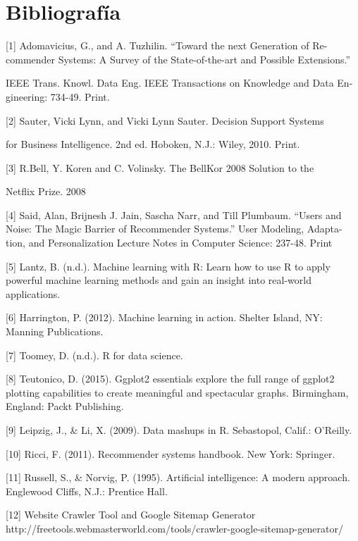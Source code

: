 \section{Bibliografía}
{[}1{]}  Adomavicius, G., and A. Tuzhilin. “Toward the next Generation of Re-
commender Systems: A Survey of the State-of-the-art and Possible Extensions.”

IEEE Trans. Knowl. Data Eng. IEEE Transactions on Knowledge and Data En-
gineering: 734-49. Print.

{[}2{]} Sauter, Vicki Lynn, and Vicki Lynn Sauter. Decision Support Systems

for Business Intelligence. 2nd ed. Hoboken, N.J.: Wiley, 2010. Print.

{[}3{]}  R.Bell, Y. Koren and C. Volinsky. The BellKor 2008 Solution to the

Netflix Prize. 2008

{[}4{]} Said, Alan, Brijnesh J. Jain, Sascha Narr, and Till Plumbaum. “Users and
Noise: The Magic Barrier of Recommender Systems.” User Modeling, Adapta-
tion, and Personalization Lecture Notes in Computer Science: 237-48. Print

{[}5{]}  Lantz, B. (n.d.). Machine learning with R: Learn how to use R to apply powerful machine learning methods and gain an insight into real-world applications.

{[}6{]} Harrington, P. (2012). Machine learning in action. Shelter Island, NY: Manning Publications.

{[}7{]} Toomey, D. (n.d.). R for data science.

{[}8{]} Teutonico, D. (2015). Ggplot2 essentials explore the full range of ggplot2 plotting capabilities to create meaningful and spectacular graphs. Birmingham, England: Packt Publishing.

{[}9{]}  Leipzig, J., \& Li, X. (2009). Data mashups in R. Sebastopol, Calif.: O'Reilly.

{[}10{]} Ricci, F. (2011). Recommender systems handbook. New York: Springer.

{[}11{]}  Russell, S., \& Norvig, P. (1995). Artificial intelligence: A modern approach. Englewood Cliffs, N.J.: Prentice Hall.

{[}12{]} Website Crawler Tool and Google Sitemap Generator \\
http://freetools.webmasterworld.com/tools/crawler-google-sitemap-generator/
